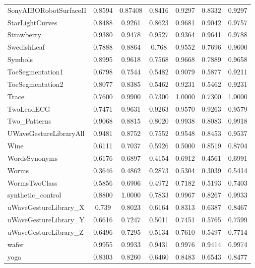 \begin{longtable}[c]{p{5cm}<{\centering}*{6}{c}}
SonyAIBORobotSurfaceII &0.8594 &0.87408 &0.8416 &0.9297 &0.8332 &0.9297 \\
StarLightCurves &0.8488 &0.9261 &0.8623 &0.9681 &0.9042 &0.9757 \\
Strawberry &0.9380 &0.9478 &0.9527 &0.9364 &0.9641 &0.9788 \\
SwedishLeaf &0.7888 &0.8864 &0.768 &0.9552 &0.7696 &0.9600 \\
Symbols &0.8995 &0.9618 &0.7568 &0.9668 &0.7889 &0.9658 \\
ToeSegmentation1 &0.6798&0.7544 &0.5482 &0.9079 &0.5877 &0.9211 \\
ToeSegmentation2 &0.8077 &0.8385 &0.5462 &0.9231 &0.5462 &0.9231 \\
Trace &0.7600 &0.9900 &0.7300 &1.0000 &0.7300 &1.0000 \\
TwoLeadECG &0.7471 &0.9631 &0.9263 &0.9570 &0.9263 &0.9579 \\
Two\_Patterns &0.9068 &0.8815 &0.8020 &0.9938 &0.8083 &0.9918 \\
UWaveGestureLibraryAll &0.9481 &0.8752 &0.7552 &0.9548 &0.8453 &0.9537 \\
Wine &0.6111 &0.7037 &0.5926 &0.5000 &0.8519 &0.8704 \\
WordsSynonyms &0.6176 &0.6897 &0.4154 &0.6912 &0.4561 &0.6991 \\
Worms &0.3646 &0.4862 &0.2873 &0.5304 &0.3039 &0.5414 \\
WormsTwoClass &0.5856 &0.6906 &0.4972 &0.7182 &0.5193 &0.7403 \\
synthetic\_control &0.8800 &1.0000 &0.7833 &0.9967 &0.8267 &0.9933 \\
uWaveGestureLibrary\_X &0.739 &0.8023 &0.6164 &0.8313 &0.6387 &0.8467 \\
uWaveGestureLibrary\_Y &0.6616 &0.7247 &0.5011 &0.7451 &0.5765 &0.7599 \\
uWaveGestureLibrary\_Z &0.6496 &0.7295 &0.5134 &0.7610 &0.5497 &0.7714 \\
wafer &0.9955 &0.9933 &0.9431 &0.9976 &0.9414 &0.9974 \\
yoga &0.8303 &0.8260 &0.6460 &0.8483 &0.6543 &0.8477 \\
\bottomrule[1.5pt]
\end{longtable}



